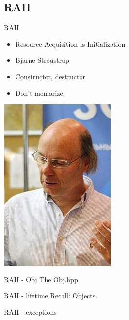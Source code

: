 \documentclass{beamer}
\begin{document}
\begin{CJK*}{UTF8}{bsmi}
    \subsection{RAII}
    \begin{frame}{RAII}
        \begin{multicols*}{2}
            \begin{itemize}
                \item Resource Acquisition Is Initialization
                \item Bjarne Stroustrup
                \item Constructor, destructor
                \item Don't memorize.
            \end{itemize}
            \includegraphics[height=.6\textheight]{Bjarne.jpg}
        \end{multicols*}
    \end{frame}

    \begin{frame}{RAII - Obj}
        The Obj.hpp
        
    \end{frame}

    \begin{frame}{RAII - lifetime}
        Recall: Objects.\\
        
    \end{frame}

    \begin{frame}{RAII - exceptions}
        
    \end{frame}


\end{CJK*}
\end{document}
